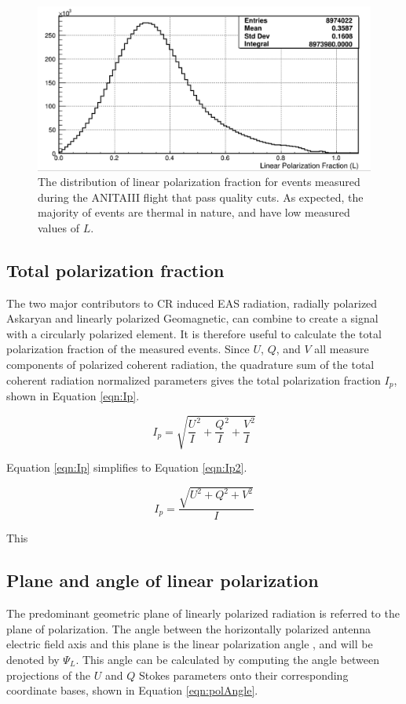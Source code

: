 	\begin{figure}
	\centering
	\includegraphics[width=\textwidth]{figures/linPolFrac_goodEvs}
	\caption{The distribution of linear polarization fraction for events measured during the ANITAIII flight that pass quality cuts.  As expected, the majority of events are thermal in nature, and have low measured values of $L$.} 
	\label{fig:LinPolFrac_goodEvs}
\end{figure}
	
	
	\subsection{Total polarization fraction}
		The two major contributors to CR induced EAS radiation, radially polarized Askaryan and linearly polarized Geomagnetic, can combine to create a signal with a circularly polarized element.  It is therefore useful to calculate the total polarization fraction of the measured events.  Since $U$, $Q$, and $V$ all measure components of polarized coherent radiation, the quadrature sum of the total coherent radiation normalized parameters gives the total polarization fraction $I_{p}$, shown in Equation \ref{eqn:Ip}.
		
	\begin{equation}
		I_p = \sqrt{\frac{U}{I}^2 + \frac{Q}{I}^2 + \frac{V}{I}^2}
	\label{eqn:Ip}
	\end{equation}

		Equation \ref{eqn:Ip} simplifies to Equation \ref{eqn:Ip2}.
		
	\begin{equation}
		I_p = \frac{\sqrt{U^2 + Q^2 + V^2}}{I}
	\label{eqn:Ip2}
	\end{equation}

		This 
	\subsection{Plane and angle of linear polarization}
		The predominant geometric plane of linearly polarized radiation is referred to the plane of polarization.  The angle between the horizontally polarized antenna electric field axis and this plane is the linear polarization angle , and will be denoted by $\Psi_{L}$.  This angle can be calculated by computing the angle between projections of the $U$ and $Q$ Stokes parameters onto their corresponding coordinate bases, shown in Equation \ref{eqn:polAngle}.
	
